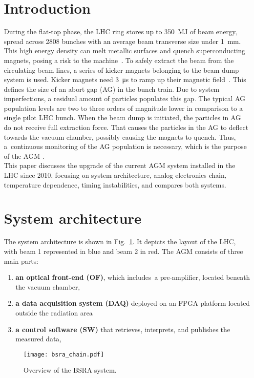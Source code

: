 \section{Introduction}
During the flat-top phase, the LHC ring stores up to \SI{350}{MJ} of beam energy, spread across 2808 bunches with an average beam transverse size under \SI{1}{mm}.
%
This high energy density can melt metallic surfaces and quench
superconducting magnets, posing a risk to the machine~\cite{LHC_report}.
%
To safely extract the beam from the circulating beam lines, a series of kicker magnets belonging to the beam dump system is used. 
%
Kicker magnets need \SI{3}{\micro\second} to ramp up their magnetic field~\cite{beam_dump_system}.
%
This defines the size of an abort gap (AG) in the bunch train.
%
Due to system imperfections, a residual amount of particles populates this gap.
%
The typical AG population levels are two to three orders of magnitude lower in comparison to a single pilot LHC bunch.
%
When the beam dump is initiated, the particles in AG do not receive full
extraction force.
%
That causes the particles in the AG to deflect towards the vacuum chamber, possibly causing the magnets to quench. 
%
Thus, a~continuous monitoring of the AG population is necessary, which is the purpose of the AGM \cite{particles_in_ag}.
\\
This paper discusses the upgrade of the current AGM system installed in the LHC since 2010, focusing on system architecture, analog electronics chain, temperature dependence, timing instabilities, and compares both systems.

\section{System architecture}
The system architecture is shown in Fig.~\ref{fig:bsra_chain}.
%
It depicts the layout of the LHC, with beam 1 represented in blue and beam 2 in red.
%
The AGM consists of three main parts:
%
\begin{enumerate}
    \item \textbf{an optical front-end (OF)}, which includes~a pre-amplifier, located beneath the vacuum chamber,
    \item \textbf{a data acquisition system (DAQ)} deployed on an FPGA platform located outside the radiation area
    \item \textbf{a control software (SW)} that retrieves, interprets, and publishes the measured data,
\end{enumerate}
%
\begin{figure}[!tbh]
    \centering
    \texttt{[image: bsra\_chain.pdf]}
    \caption{Overview of the BSRA system.}
    \label{fig:bsra_chain}
\end{figure} 

